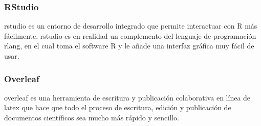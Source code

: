 \documentclass[../../main.tex]{subfiles}
\begin{document}
\subsubsection{RStudio}
\gls{rstudio}\cite{doc15} es un entorno de desarrollo integrado que permite interactuar con R más fácilmente. \gls{rstudio} es en realidad un complemento del lenguaje de programación \gls{rlang}, en el cual toma el software R y le añade una interfaz gráfica muy fácil de usar.

\subsubsection{Overleaf}
\Gls{overleaf}\cite{doc17} es una herramienta de escritura y publicación colaborativa en línea de \gls{latex} que hace que todo el proceso de escritura, edición y publicación de documentos científicos sea mucho más rápido y sencillo.
\end{document}
